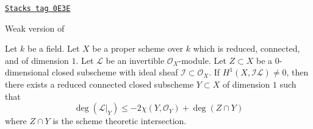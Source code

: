 \begin{lemma}
\label{curves-lemma-vanishing-on-gorenstein}
\href{https://stacks.math.columbia.edu/tag/0E3E}{\texttt{Stacks tag 0E3E}}

\begin{reference}
Weak version of \cite[Lemma 4]{Jongmin}
\end{reference}
Let $k$ be a field. Let $X$ be a proper scheme over $k$
which is reduced, connected, and of dimension $1$.
Let $\mathcal{L}$ be an invertible $\mathcal{O}_X$-module.
Let $Z \subset X$ be a $0$-dimensional closed subscheme with ideal
sheaf $\mathcal{I} \subset \mathcal{O}_X$.
If $H^1(X, \mathcal{I}\mathcal{L}) \not = 0$, then there exists
a reduced connected closed subscheme $Y \subset X$
of dimension $1$ such that
$$
\deg(\mathcal{L}|_Y) \leq -2\chi(Y, \mathcal{O}_Y) + \deg(Z \cap Y)
$$
where $Z \cap Y$ is the scheme theoretic intersection.
\end{lemma}

